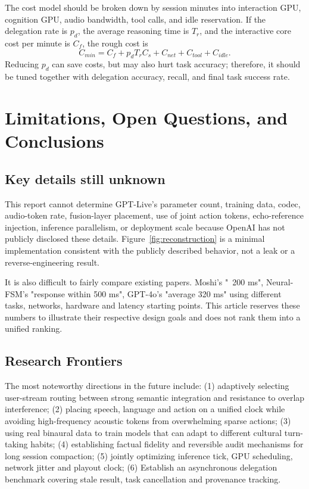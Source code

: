 \documentclass[UTF8,fontset=none,a4paper,10pt]{ctexart}
\begin{document}
The cost model should be broken down by session minutes into interaction GPU, cognition GPU, audio bandwidth, tool calls, and idle reservation. If the delegation rate is $p_d$, the average reasoning time is $T_r$, and the interactive core cost per minute is $C_f$, the rough cost is
\begin{equation}
C_{min}=C_f+p_dT_rC_s+C_{net}+C_{tool}+C_{idle}.
\end{equation}
Reducing $p_d$ can save costs, but may also hurt task accuracy; therefore, it should be tuned together with delegation accuracy, recall, and final task success rate.

\section{Limitations, Open Questions, and Conclusions}

\subsection{Key details still unknown}

This report cannot determine GPT-Live's parameter count, training data, codec, audio-token rate, fusion-layer placement, use of joint action tokens, echo-reference injection, inference parallelism, or deployment scale because OpenAI has not publicly disclosed these details. Figure~\ref{fig:reconstruction} is a minimal implementation consistent with the publicly described behavior, not a leak or a reverse-engineering result.

It is also difficult to fairly compare existing papers. Moshi's "~200 ms", Neural-FSM's "response within 500 ms", GPT-4o's "average 320 ms" using different tasks, networks, hardware and latency starting points. This article reserves these numbers to illustrate their respective design goals and does not rank them into a unified ranking.

\subsection{Research Frontiers}

The most noteworthy directions in the future include: (1) adaptively selecting user-stream routing between strong semantic integration and resistance to overlap interference; (2) placing speech, language and action on a unified clock while avoiding high-frequency acoustic tokens from overwhelming sparse actions; (3) using real binaural data to train models that can adapt to different cultural turn-taking habits; (4) establishing factual fidelity and reversible audit mechanisms for long session compaction; (5) jointly optimizing inference tick, GPU scheduling, network jitter and playout clock; (6) Establish an asynchronous delegation benchmark covering stale result, task cancellation and provenance tracking.
\end{document}
